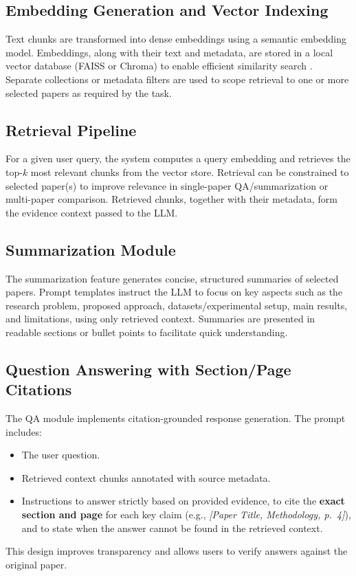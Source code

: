 \subsection{Embedding Generation and Vector Indexing}
Text chunks are transformed into dense embeddings using a semantic embedding model. Embeddings, along with their text and metadata, are stored in a local vector database (FAISS or Chroma) to enable efficient similarity search \cite{b10,b11}. Separate collections or metadata filters are used to scope retrieval to one or more selected papers as required by the task.

\subsection{Retrieval Pipeline}
For a given user query, the system computes a query embedding and retrieves the top-$k$ most relevant chunks from the vector store. Retrieval can be constrained to selected paper(s) to improve relevance in single-paper QA/summarization or multi-paper comparison. Retrieved chunks, together with their metadata, form the evidence context passed to the LLM.

\subsection{Summarization Module}
The summarization feature generates concise, structured summaries of selected papers. Prompt templates instruct the LLM to focus on key aspects such as the research problem, proposed approach, datasets/experimental setup, main results, and limitations, using only retrieved context. Summaries are presented in readable sections or bullet points to facilitate quick understanding.

\subsection{Question Answering with Section/Page Citations}
The QA module implements citation-grounded response generation. The prompt includes:
\begin{itemize}
    \item The user question.
    \item Retrieved context chunks annotated with source metadata.
    \item Instructions to answer strictly based on provided evidence, to cite the \textbf{exact section and page} for each key claim (e.g., \textit{[Paper Title, Methodology, p.~4]}), and to state when the answer cannot be found in the retrieved context.
\end{itemize}
This design improves transparency and allows users to verify answers against the original paper.

